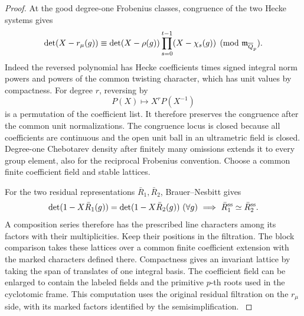 \begin{proof}
At the good degree-one Frobenius classes, congruence of
the two Hecke systems gives
\[
 \det(X-r_\mu(g))\equiv
 \det(X-\rho(g))\prod_{s=0}^{t-1}(X-\chi_s(g))
                 \pmod {\mathfrak m_{\overline{Q}_p}} .
\]
Indeed the reversed polynomial has Hecke coefficients times
signed integral norm powers and powers of the common twisting
character, which has unit values by compactness. For degree \(r\), reversing by
\[
 P(X)\mapsto X^rP(X^{-1})
\]
is a permutation of the coefficient list. It therefore
preserves the congruence after the common unit normalizations. The congruence
locus is closed because all coefficients are continuous and
the open unit ball in an ultrametric field is closed.
Degree-one Chebotarev density after finitely many omissions
extends it to every group element, also for the reciprocal
Frobenius convention. Choose a common finite coefficient field
and stable lattices.

For the two residual representations \(\bar R_1,\bar R_2\), Brauer--Nesbitt gives
\[
 \det(1-X\bar R_1(g))=\det(1-X\bar R_2(g))\ (\forall g)\ \Longrightarrow\ \bar R_1^{\rm ss}\simeq\bar R_2^{\rm ss}.
\]
A composition series therefore has the
prescribed line characters among its factors with their
multiplicities. Keep their positions in the filtration.
The block comparison takes these lattices over a common
finite coefficient extension with the marked characters
defined there. Compactness gives an invariant lattice
by taking the span of translates of one integral basis.
The coefficient field can be enlarged to contain the
labeled fields and the primitive \(p\)-th roots used in
the cyclotomic frame. This computation uses the original
residual filtration on the \(r_\mu\) side, with its
marked factors identified by the semisimplification.
\label{cor:lift-crystalline-depth-4}
\end{proof}


